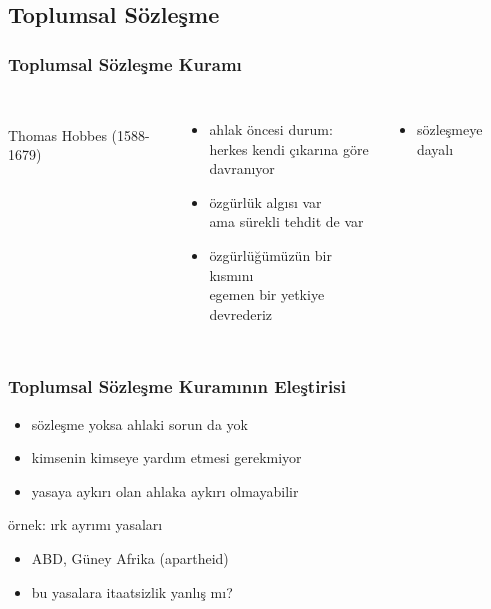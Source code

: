 \documentclass[dvipsnames]{beamer}
\theoremstyle{plain}
\begin{document}
\subsection{Toplumsal Sözleşme}

\begin{frame}
  \frametitle{Toplumsal Sözleşme Kuramı}

  \begin{columns}
    \begin{center}
      \\
      Thomas Hobbes (1588-1679)
    \end{center}

    \pause
    \begin{itemize}
      \item ahlak öncesi durum:\\
        herkes kendi çıkarına göre\\
        davranıyor
      \item özgürlük algısı var\\
        ama sürekli tehdit de var
      \item özgürlüğümüzün bir kısmını\\
        egemen bir yetkiye devrederiz
    \end{itemize}

    \begin{itemize}
      \item sözleşmeye dayalı
    \end{itemize}
  \end{columns}
\end{frame}

\begin{frame}
  \frametitle{Toplumsal Sözleşme Kuramının Eleştirisi}

  \begin{itemize}
    \item sözleşme yoksa ahlaki sorun da yok
    \item kimsenin kimseye yardım etmesi gerekmiyor

    \pause
    \medskip
    \item yasaya aykırı olan ahlaka aykırı olmayabilir
  \end{itemize}

  \begin{exampleblock}{örnek: ırk ayrımı yasaları}
    \begin{itemize}
      \item ABD, Güney Afrika (apartheid)
      \item bu yasalara itaatsizlik yanlış mı?
    \end{itemize}
  \end{exampleblock}
\end{frame}
\end{document}
